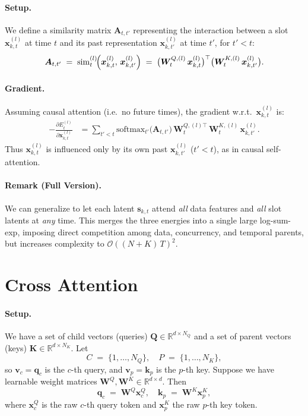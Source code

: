 \documentclass{article}
\begin{document}
\paragraph{Setup.}
We define a similarity matrix \(\bm{A}_{t,t'}\) representing the interaction between a slot \(\bm{x}_{k,t}^{(l)}\) at time \(t\) and its past representation \(\bm{x}_{k,t'}^{(l)}\) at time \(t'\), for \(t'<t\):
\begin{equation}
\bm{A}_{t,t'} \;=\;
\mathrm{sim}_{t}^{(l)}\!\Bigl(\bm{x}_{k,t}^{(l)},\,\bm{x}_{k,t'}^{(l)}\Bigr)
\;=\;
\bigl(\bm{W}_{t}^{Q,(l)}\,\bm{x}_{k,t}^{(l)}\bigr)^\top
\bigl(\bm{W}_{t}^{K,(l)}\,\bm{x}_{k,t'}^{(l)}\bigr).
\end{equation}

\paragraph{Gradient.}
Assuming causal attention (i.e.\ no future times), the gradient w.r.t.\ \(\bm{x}_{k,t}^{(l)}\) is:
\begin{equation}
\begin{aligned}
-\frac{\partial E_{t}^{(l)}}{\partial \bm{x}_{k,t}^{(l)}}
&=
\sum_{t'<t}
\mathrm{softmax}_{t'}\bigl(\bm{A}_{t,t'}\bigr)\,
\bm{W}_{t}^{Q,(l)\top}\,\bm{W}_{t}^{K,(l)}\,\bm{x}_{k,t'}^{(l)}.
\end{aligned}
\end{equation}
Thus \(\bm{x}_{k,t}^{(l)}\) is influenced only by its own past \(\bm{x}_{k,t'}^{(l)}\) (\(t'<t\)), as in causal self-attention.



\paragraph{Remark (Full Version).}
We can generalize to let each latent \(\bm{s}_{k,t}\) attend \emph{all} data features and \emph{all} slot latents at \emph{any} time.  This merges the three energies into a single large log-sum-exp, imposing direct competition among data, concurrency, and temporal parents, but increases complexity to \(\mathcal{O}((N + K)\,T)^2\). 

    
    \section{Cross Attention}

    \paragraph{Setup.}
    We have a set of child vectors (queries) \(\bm{Q}\in\mathbb{R}^{d\times N_Q}\) and a set of parent vectors (keys) \(\bm{K}\in\mathbb{R}^{d\times N_K}\).  Let
    \[
    C \;=\;\{1,\ldots,N_Q\}, 
    \quad
    P \;=\;\{1,\ldots,N_K\},
    \]
    so \(\bm{v}_c = \bm{q}_c\) is the \(c\)-th query, and \(\bm{v}_p = \bm{k}_p\) is the \(p\)-th key.  Suppose we have learnable weight matrices \(\bm{W}^Q,\bm{W}^K \in \mathbb{R}^{d \times d}\).  Then
    \[
    \bm{q}_c 
    \;=\;
    \bm{W}^Q\bm{x}^Q_c,
    \quad
    \bm{k}_p 
    \;=\;
    \bm{W}^K\bm{x}^K_p,
    \]
    where \(\bm{x}^Q_c\) is the raw \(c\)-th query token and \(\bm{x}^K_p\) the raw \(p\)-th key token.
    
\end{document}
